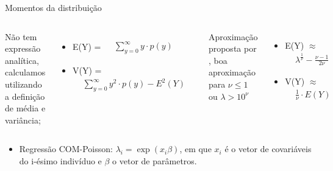 \documentclass[10pt, aspectratio=169]{beamer}\usepackage[]{graphicx}\usepackage[]{color}
\begin{document}
\begin{frame}{Momentos da distribuição}

\begin{columns}[t,onlytextwidth]
Não tem expressão analítica, calculamos utilizando a definição de média e
variância;
\begin{itemize}
  \itemsep7.5pt\parskip0pt
  \item E(Y) = $\begin{aligned} 
            &\sum_{y = 0}^{\infty} y \cdot p(y)&
        \end{aligned}
        $
  \item V(Y) = $\begin{aligned} 
            &\sum_{y = 0}^{\infty} y^2 \cdot p(y) - E^2(Y)&
        \end{aligned}
        $
\end{itemize}

Aproximação proposta por \cite{Shimueli2005}, boa aproximação para $\nu 
\leq 1$ ou $\lambda > 10^\nu$ \\[0.2cm]
\begin{itemize}
  \itemsep7.5pt\parskip0pt
  \item E(Y) $\approx$ $\begin{aligned} 
            &\lambda ^ \frac{1}{\nu} - \frac{\nu - 1}{2\nu}&
        \end{aligned}
        $ 
  \item V(Y) $\approx$ $\begin{aligned} 
            &\frac{1}{\nu}\cdot E(Y)&
        \end{aligned}
        $
\end{itemize}
\end{columns}
\begin{itemize}
  \item Regressão COM-Poisson: $\lambda_i = \exp(x_i \beta)$, 
  em que $x_i$ é o vetor de covariáveis do i-ésimo indivíduo e 
  $\beta$ o vetor de parâmetros.
\end{itemize}
\end{frame}

\end{document}
